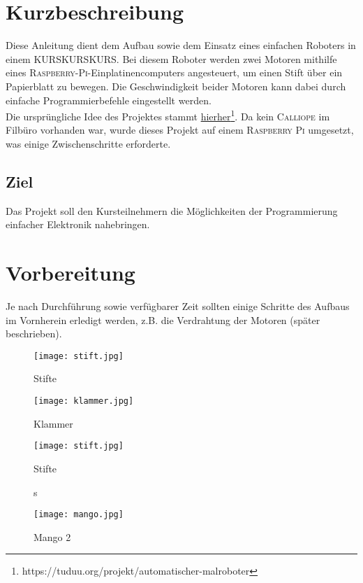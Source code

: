 \section{Kurzbeschreibung}
Diese Anleitung dient dem Aufbau sowie dem Einsatz eines einfachen Roboters in einem KURSKURSKURS. Bei diesem Roboter werden zwei Motoren mithilfe eines \textsc{Raspberry-Pi}-Einplatinencomputers angesteuert, um einen Stift über ein  Papierblatt zu bewegen. Die Geschwindigkeit beider Motoren kann dabei durch einfache Programmierbefehle eingestellt werden.\\

Die ursprüngliche Idee des Projektes stammt \href{https://tuduu.org/projekt/automatischer-malroboter}{hierher}\footnote[1]{https://tuduu.org/projekt/automatischer-malroboter}. Da kein \textsc{Calliope} im Filbüro vorhanden war, wurde dieses Projekt auf einem \textsc{Raspberry Pi} umgesetzt, was einige Zwischenschritte erforderte.\\

\subsection{Ziel}
Das Projekt soll den Kursteilnehmern die Möglichkeiten der Programmierung einfacher Elektronik nahebringen.

\section{Vorbereitung}
Je nach Durchführung sowie verfügbarer Zeit sollten einige Schritte des Aufbaus im Vornherein erledigt werden, z.B. die Verdrahtung der Motoren (später beschrieben).\\

\begin{figure}[h]
\centering
\parbox{5cm}{
\texttt{[image: stift.jpg]}
\caption*{Stifte}
}
\qquad
\begin{minipage}{5cm}
\texttt{[image: klammer.jpg]}
\caption*{Klammer}
\end{minipage}
\end{figure}

\begin{figure}[h]
\centering
\parbox{5cm}{
\texttt{[image: stift.jpg]}
\caption*{Stifte}s
}
\hfill
\begin{minipage}{5cm}
\texttt{[image: mango.jpg]}
\caption*{Mango 2}
\end{minipage}
\end{figure}

